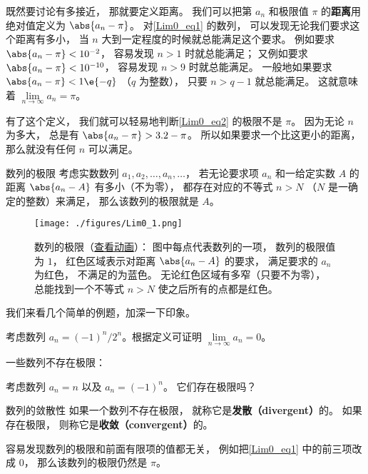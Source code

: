 既然要讨论有多接近， 那就要定义距离。 我们可以把第 $a_n$ 和极限值 $\pi$ 的\textbf{距离}用绝对值定义为 $\abs{a_n - \pi}$。 对\autoref{Lim0_eq1} 的数列， 可以发现无论我们要求这个距离有多小， 当 $n$ 大到一定程度的时候就总能满足这个要求。 例如要求 $\abs{a_n - \pi} < 10^{-2}$， 容易发现 $n > 1$ 时就总能满足； 又例如要求 $\abs{a_n - \pi} < 10^{-10}$， 容易发现 $n > 9$ 时就总能满足。 一般地如果要求 $\abs{a_n - \pi} < 1\e{-q}$ （$q$ 为整数）， 只要 $n > q-1$ 就总能满足。 这就意味着 $\lim\limits_{n \to \infty } a_n = \pi$。

有了这个定义， 我们就可以轻易地判断\autoref{Lim0_eq2} 的极限不是 $\pi$。 因为无论 $n$ 为多大， 总是有 $\abs{a_n - \pi} > 3.2 - \pi$。 所以如果要求一个比这更小的距离， 那么就没有任何 $n$ 可以满足。

\begin{definition}{数列的极限}\label{Lim0_def2}
考虑实数数列 $a_1, a_2, \dots, a_n, \dots$， 若无论要求项 $a_n$ 和一给定实数 $A$ 的距离 $\abs{a_n - A}$ 有多小（不为零）， 都存在对应的不等式 $n > N$ （$N$ 是一确定的整数）来满足， 那么该数列的极限就是 $A$。
\end{definition}

\begin{figure}[ht]
\centering
\texttt{[image: ./figures/Lim0\_1.png]}
\caption{数列的极限（\href{https://wuli.wiki/apps/Lim0.html}{查看动画}）： 图中每点代表数列的一项， 数列的极限值为 $1$， 红色区域表示对距离 $\abs{a_n - A}$ 的要求， 满足要求的 $a_n$ 为红色， 不满足的为蓝色。 无论红色区域有多窄（只要不为零）， 总能找到一个不等式 $n > N$ 使之后所有的点都是红色。} \label{Lim0_fig1}
\end{figure}

我们来看几个简单的例题，加深一下印象。

\begin{example}{}
考虑数列 $a_n= {(-1)^n}/{2^n}$。根据定义可证明 $\lim\limits_{n\to\infty}a_n=0$。
\end{example}

一些数列不存在极限：
\begin{example}{}\label{Lim0_exe1}
考虑数列 $a_n = n$ 以及 $a_n=(-1)^n$。 它们存在极限吗？
\end{example}

\begin{definition}{数列的敛散性}\label{Lim0_def4}
如果一个数列不存在极限， 就称它是\textbf{发散（divergent）}的。 如果存在极限， 则称它是\textbf{收敛（convergent）}的。
\end{definition}

\begin{example}{}
容易发现数列的极限和前面有限项的值都无关， 例如把\autoref{Lim0_eq1} 中的前三项改成 $0$， 那么该数列的极限仍然是 $\pi$。
\end{example}

